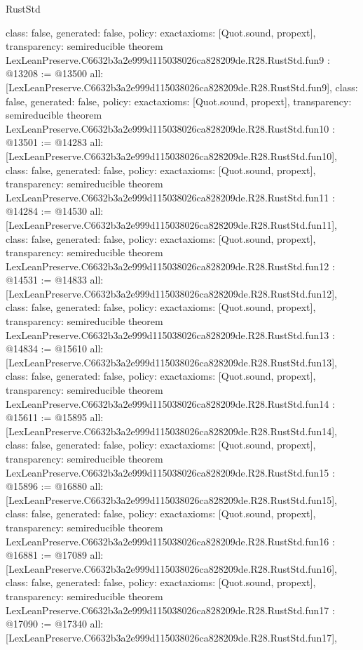 \begin{lexlean}{RustStd}
\begin{coremodule}
{  class: false,
  generated: false,
  policy: exact{axioms: [Quot.sound, propext]},
  transparency: semireducible
}
theorem LexLeanPreserve.C6632b3a2e999d115038026ca828209de.R28.RustStd.fun9 : @13208 := @13500 {
  all: [LexLeanPreserve.C6632b3a2e999d115038026ca828209de.R28.RustStd.fun9],
  class: false,
  generated: false,
  policy: exact{axioms: [Quot.sound, propext]},
  transparency: semireducible
}
theorem LexLeanPreserve.C6632b3a2e999d115038026ca828209de.R28.RustStd.fun10 : @13501 := @14283 {
  all: [LexLeanPreserve.C6632b3a2e999d115038026ca828209de.R28.RustStd.fun10],
  class: false,
  generated: false,
  policy: exact{axioms: [Quot.sound, propext]},
  transparency: semireducible
}
theorem LexLeanPreserve.C6632b3a2e999d115038026ca828209de.R28.RustStd.fun11 : @14284 := @14530 {
  all: [LexLeanPreserve.C6632b3a2e999d115038026ca828209de.R28.RustStd.fun11],
  class: false,
  generated: false,
  policy: exact{axioms: [Quot.sound, propext]},
  transparency: semireducible
}
theorem LexLeanPreserve.C6632b3a2e999d115038026ca828209de.R28.RustStd.fun12 : @14531 := @14833 {
  all: [LexLeanPreserve.C6632b3a2e999d115038026ca828209de.R28.RustStd.fun12],
  class: false,
  generated: false,
  policy: exact{axioms: [Quot.sound, propext]},
  transparency: semireducible
}
theorem LexLeanPreserve.C6632b3a2e999d115038026ca828209de.R28.RustStd.fun13 : @14834 := @15610 {
  all: [LexLeanPreserve.C6632b3a2e999d115038026ca828209de.R28.RustStd.fun13],
  class: false,
  generated: false,
  policy: exact{axioms: [Quot.sound, propext]},
  transparency: semireducible
}
theorem LexLeanPreserve.C6632b3a2e999d115038026ca828209de.R28.RustStd.fun14 : @15611 := @15895 {
  all: [LexLeanPreserve.C6632b3a2e999d115038026ca828209de.R28.RustStd.fun14],
  class: false,
  generated: false,
  policy: exact{axioms: [Quot.sound, propext]},
  transparency: semireducible
}
theorem LexLeanPreserve.C6632b3a2e999d115038026ca828209de.R28.RustStd.fun15 : @15896 := @16880 {
  all: [LexLeanPreserve.C6632b3a2e999d115038026ca828209de.R28.RustStd.fun15],
  class: false,
  generated: false,
  policy: exact{axioms: [Quot.sound, propext]},
  transparency: semireducible
}
theorem LexLeanPreserve.C6632b3a2e999d115038026ca828209de.R28.RustStd.fun16 : @16881 := @17089 {
  all: [LexLeanPreserve.C6632b3a2e999d115038026ca828209de.R28.RustStd.fun16],
  class: false,
  generated: false,
  policy: exact{axioms: [Quot.sound, propext]},
  transparency: semireducible
}
theorem LexLeanPreserve.C6632b3a2e999d115038026ca828209de.R28.RustStd.fun17 : @17090 := @17340 {
  all: [LexLeanPreserve.C6632b3a2e999d115038026ca828209de.R28.RustStd.fun17],
}
\end{coremodule}
\end{lexlean}
